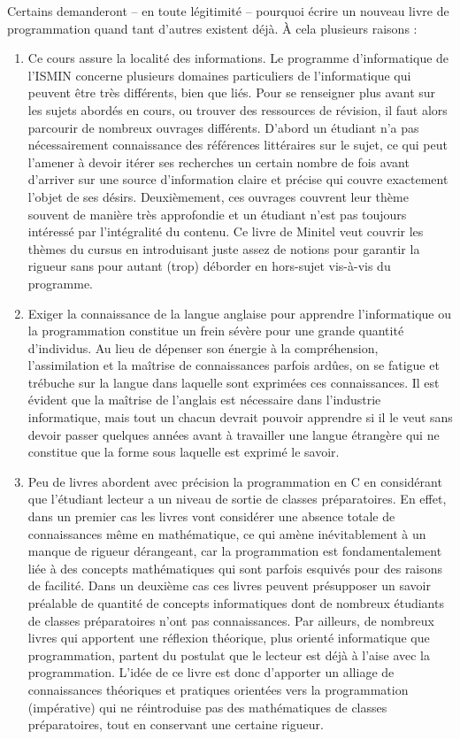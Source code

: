 \documentclass[../main.tex]{subfiles}
\begin{document}
Certains demanderont -- en toute légitimité -- pourquoi écrire un nouveau livre de programmation quand tant d'autres existent déjà. À cela plusieurs raisons :
\begin{enumerate}
	\item Ce cours assure la localité des informations. Le programme d'informatique de l'ISMIN concerne plusieurs domaines particuliers de l'informatique qui peuvent être très différents, bien que liés. Pour se renseigner plus avant sur les sujets abordés en cours, ou trouver des ressources de révision, il faut alors parcourir de nombreux ouvrages différents. D'abord un étudiant n'a pas nécessairement connaissance des références littéraires sur le sujet, ce qui peut l'amener à devoir itérer ses recherches un certain nombre de fois avant d'arriver sur une source d'information claire et précise qui couvre exactement l'objet de ses désirs. Deuxièmement, ces ouvrages couvrent leur thème souvent de manière très approfondie et un étudiant n'est pas toujours intéressé par l'intégralité du contenu. Ce livre de Minitel veut couvrir les thèmes du cursus en introduisant juste assez de notions pour garantir la rigueur sans pour autant (trop) déborder en hors-sujet vis-à-vis du programme.
	\item Exiger la connaissance de la langue anglaise pour apprendre l'informatique ou la programmation constitue un frein sévère pour une grande quantité d'individus. Au lieu de dépenser son énergie à la compréhension, l'assimilation et la maîtrise de connaissances parfois ardûes, on se fatigue et trébuche sur la langue dans laquelle sont exprimées ces connaissances. Il est évident que la maîtrise de l'anglais est nécessaire dans l'industrie informatique, mais tout un chacun devrait pouvoir apprendre si il le veut sans devoir passer quelques années avant à travailler une langue étrangère qui ne constitue que la forme sous laquelle est exprimé le savoir.
	\item Peu de livres abordent avec précision la programmation en C en considérant que l'étudiant lecteur a un niveau de sortie de classes préparatoires. En effet, dans un premier cas les livres vont considérer une absence totale de connaissances même en mathématique, ce qui amène inévitablement à un manque de rigueur dérangeant, car la programmation est fondamentalement liée à des concepts mathématiques qui sont parfois esquivés pour des raisons de facilité. Dans un deuxième cas ces livres peuvent présupposer un savoir préalable de quantité de concepts informatiques dont de nombreux étudiants de classes préparatoires n'ont pas connaissances. Par ailleurs, de nombreux livres qui apportent une réflexion théorique, plus orienté informatique que programmation, partent du postulat que le lecteur est déjà à l'aise avec la programmation. L'idée de ce livre est donc d'apporter un alliage de connaissances théoriques et pratiques orientées vers la programmation (impérative) qui ne réintroduise pas des mathématiques de classes préparatoires, tout en conservant une certaine rigueur.

\end{enumerate}
\end{document}
